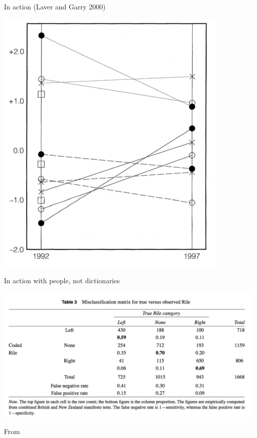 \documentclass{hertieteaching}
\begin{document}
\begin{frame}{In action (Laver and Garry 2000)}
\protect\hypertarget{in-action-laver-and-garry-2000}{}

{\centering \includegraphics[width=0.4\linewidth]{pictures/lg-shrinkage} 

}

\end{frame}

\begin{frame}{In action with people, not dictionaries}

\begin{center}\includegraphics[width=0.8\linewidth]{pictures/slava-rile3} \end{center}

From \textcite{Mikhaylov.etal2011}

\end{frame}
\end{document}
